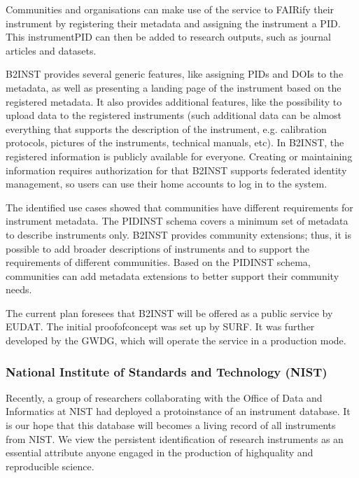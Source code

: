 \documentclass[a4paper,10pt,english]{sphinxmanual}
\begin{document}
\sphinxAtStartPar
Communities and organisations can make use of the service to FAIRify
their instrument by registering their metadata and assigning the
instrument a PID.  This instrument\sphinxhyphen{}PID can then be added to research
outputs, such as journal articles and datasets.

\sphinxAtStartPar
B2INST provides several generic features, like assigning PIDs and DOIs
to the metadata, as well as presenting a landing page of the
instrument based on the registered metadata.  It also provides
additional features, like the possibility to upload data to the
registered instruments (such additional data can be almost everything
that supports the description of the instrument, e.g. calibration
protocols, pictures of the instruments, technical manuals, etc).  In
B2INST, the registered information is publicly available for everyone.
Creating or maintaining information requires authorization \sphinxhyphen{} for that
B2INST supports federated identity management, so users can use their
home accounts to log in to the system.

\sphinxAtStartPar
The identified use cases showed that communities have different
requirements for instrument metadata.  The PIDINST schema covers a
minimum set of metadata to describe instruments only.  B2INST provides
community extensions; thus, it is possible to add broader descriptions
of instruments and to support the requirements of different
communities.  Based on the PIDINST schema, communities can add
metadata extensions to better support their community needs.

\sphinxAtStartPar
The current plan foresees that B2INST will be offered as a public
service by EUDAT.  The initial proof\sphinxhyphen{}of\sphinxhyphen{}concept was set up by SURF.
It was further developed by the GWDG, which will operate the service
in a production mode.


\subsubsection{National Institute of Standards and Technology (NIST)}
\label{\detokenize{white-paper/adoption:national-institute-of-standards-and-technology-nist}}
\sphinxAtStartPar
Recently, a group of researchers collaborating with the Office of Data
and Informatics at NIST had deployed a proto\sphinxhyphen{}instance of an instrument
database.  It is our hope that this database will becomes a living
record of all instruments from NIST.  We view the persistent
identification of research instruments as an essential attribute
anyone engaged in the production of high\sphinxhyphen{}quality and reproducible
science.
\end{document}
